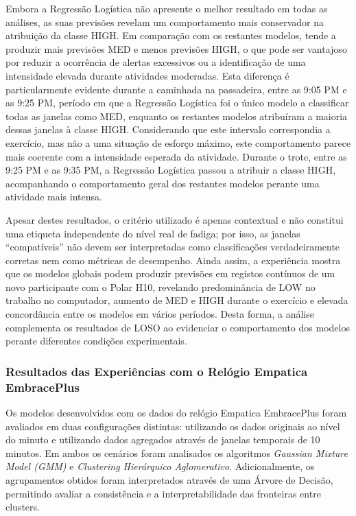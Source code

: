 Embora a Regressão Logística não apresente o melhor resultado em todas as análises, as suas previsões revelam um comportamento mais conservador na atribuição da classe HIGH. Em comparação com os restantes modelos, tende a produzir mais previsões MED e menos previsões HIGH, o que pode ser vantajoso por reduzir a ocorrência de alertas excessivos ou a identificação de uma intensidade elevada durante atividades moderadas. Esta diferença é particularmente evidente durante a caminhada na passadeira, entre as 9:05 PM e as 9:25 PM, período em que a Regressão Logística foi o único modelo a classificar todas as janelas como MED, enquanto os restantes modelos atribuíram a maioria dessas janelas à classe HIGH. Considerando que este intervalo correspondia a exercício, mas não a uma situação de esforço máximo, este comportamento parece mais coerente com a intensidade esperada da atividade. Durante o trote, entre as 9:25 PM e as 9:35 PM, a Regressão Logística passou a atribuir a classe HIGH, acompanhando o comportamento geral dos restantes modelos perante uma atividade mais intensa.

Apesar destes resultados, o critério utilizado é apenas contextual e não constitui uma etiqueta independente do nível real de fadiga; por isso, as janelas ``compatíveis'' não devem ser interpretadas como classificações verdadeiramente corretas nem como métricas de desempenho. Ainda assim, a experiência mostra que os modelos globais podem produzir previsões em registos contínuos de um novo participante com o Polar H10, revelando predominância de LOW no trabalho no computador, aumento de MED e HIGH durante o exercício e elevada concordância entre os modelos em vários períodos. Desta forma, a análise complementa os resultados de LOSO ao evidenciar o comportamento dos modelos perante diferentes condições experimentais.

\subsubsection*{Resultados das Experiências com o Relógio Empatica EmbracePlus}

Os modelos desenvolvidos com os dados do relógio Empatica EmbracePlus foram avaliados em duas configurações distintas: utilizando os dados originais ao nível do minuto e utilizando dados agregados através de janelas temporais de 10 minutos. Em ambos os cenários foram analisados os algoritmos \textit{Gaussian Mixture Model (GMM)} e \textit{Clustering Hierárquico Aglomerativo}. Adicionalmente, os agrupamentos obtidos foram interpretados através de uma Árvore de Decisão, permitindo avaliar a consistência e a interpretabilidade das fronteiras entre clusters.

